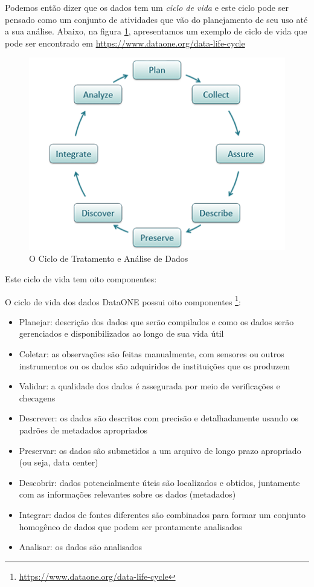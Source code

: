 \documentclass[12pt,a4paper,oneside]{erdc}
\begin{document}
Podemos então dizer que os dados tem um \textit{ciclo de vida} e este ciclo pode ser pensado como um conjunto de atividades que vão do planejamento de seu uso até a sua análise. Abaixo, na figura \ref{fig:f02-01}, apresentamos um exemplo de ciclo de vida que pode ser encontrado em  \url{https://www.dataone.org/data-life-cycle}


\begin{figure}[htpb]
	\centering
	\includegraphics[width=\linewidth]{../figs/BP_Curso_TecComp_00_2019_f02-01}
	\caption{O Ciclo de Tratamento e Análise de Dados}
	\label{fig:f02-01}
\end{figure}


Este ciclo de vida tem oito componentes:


O ciclo de vida dos dados DataONE possui oito componentes \footnote{\url{https://www.dataone.org/data-life-cycle}}:

\begin{itemize}
	\item Planejar: descrição dos dados que serão compilados e como os dados serão gerenciados e disponibilizados ao longo de sua vida útil
	\item Coletar: as observações são feitas manualmente, com sensores ou outros instrumentos ou os dados são adquiridos de instituições que os produzem
	\item Validar: a qualidade dos dados é assegurada por meio de verificações e checagens
	\item Descrever: os dados são descritos com precisão e detalhadamente usando os padrões de metadados apropriados
	\item Preservar: os dados são submetidos a um arquivo de longo prazo apropriado (ou seja, data center)
	\item Descobrir: dados potencialmente úteis são localizados e obtidos, juntamente com as informações relevantes sobre os dados (metadados)
	\item Integrar: dados de fontes diferentes são combinados para formar um conjunto homogêneo de dados que podem ser prontamente analisados
	\item Analisar: os dados são analisados
	
\end{itemize}
\end{document}
